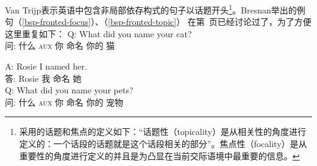 Van Trijp表示英语中包含非局部依存构式的句子以话题开头\footnote{%
采用的话题和焦点的定义如下：“话题性（topicality）是从相关性的角度进行定义的：一个话段的话题就是这个话段相关的部分”。焦点性（focality）是从重要性的角度进行定义的并且是为凸显在当前交际语境中最重要的信息。
}。Bresnan举出的例句（\ref{bsp-fronted-focus}）、（\ref{bsp-fronted-topic}） 在第~\pageref{bsp-fronted-focus}页\citep[]{Bresnan2001a}已经讨论过了，为了方便这里重复如下：
\ea
\label{bsp-fronted-focus-two}
\gll Q: What did you name your cat?\\  
     问: 什么 \textsc{aux} 你 命名 你的 猫\\

\gll A: Rosie I named her. \\
     答: Rosie 我 命名 她\\
\z
\ea
\label{bsp-fronted-topic-two}
\gll Q: What did you name your pets?\\    
     问: 什么 \textsc{aux} 你 命名 你的 宠物\\

